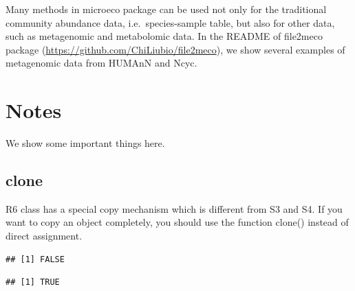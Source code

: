 \documentclass[
]{book}
\newenvironment{Shaded}{\begin{snugshade}}{\end{snugshade}}
\newcommand{\CommentTok}[1]{\textcolor[rgb]{0.56,0.35,0.01}{\textit{#1}}}
\newcommand{\ConstantTok}[1]{\textcolor[rgb]{0.00,0.00,0.00}{#1}}
\newcommand{\FunctionTok}[1]{\textcolor[rgb]{0.00,0.00,0.00}{#1}}
\newcommand{\NormalTok}[1]{#1}
\newcommand{\OtherTok}[1]{\textcolor[rgb]{0.56,0.35,0.01}{#1}}
\newcommand{\SpecialCharTok}[1]{\textcolor[rgb]{0.00,0.00,0.00}{#1}}
\begin{document}
Many methods in microeco package can be used not only for the traditional community abundance data, i.e.~species-sample table,
but also for other data, such as metagenomic and metabolomic data.
In the README of file2meco package (\url{https://github.com/ChiLiubio/file2meco}),
we show several examples of metagenomic data from HUMAnN and Ncyc.

\hypertarget{notes}{%
\chapter{Notes}\label{notes}}

We show some important things here.

\hypertarget{clone}{%
\section{clone}\label{clone}}

R6 class has a special copy mechanism which is different from S3 and S4.
If you want to copy an object completely, you should use the function clone() instead of direct assignment.

\begin{Shaded}
\end{Shaded}

\begin{verbatim}
## [1] FALSE
\end{verbatim}

\begin{Shaded}
\end{Shaded}

\begin{verbatim}
## [1] TRUE
\end{verbatim}
\end{document}
